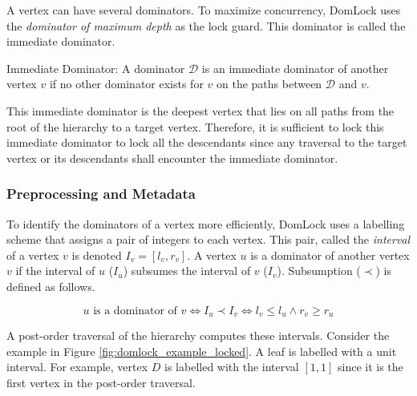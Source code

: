 A vertex can have several dominators. 
To maximize concurrency, DomLock uses the \emph{dominator of maximum depth} as the lock guard. This dominator is called the immediate dominator. 


\begin{definition}
    Immediate Dominator: A dominator $\mathcal{D}$ is an immediate dominator of another vertex $v$ if no other dominator exists for $v$ on the paths between $\mathcal{D}$ and $v$.
\end{definition}

This immediate dominator is the deepest vertex that lies on all paths from the root of the hierarchy to a target vertex. Therefore, it is sufficient to lock this immediate dominator to lock all the descendants since any traversal to the target vertex or its descendants shall encounter the immediate dominator.

\subsubsection{Preprocessing and Metadata}

To identify the dominators of a vertex more efficiently, DomLock uses a labelling scheme that assigns a pair of integers to each vertex. This pair, called the \emph{interval} of a vertex $v$ is denoted  $I_v = [l_v, r_v]$. 
A vertex $u$ is a dominator of another vertex $v$ if the interval of $u$ ($I_u$) subsumes the interval of $v$ ($I_v$). Subsumption ($\prec$) is defined as follows.


\begin{equation}
    u \text{ is a dominator of } v \iff I_u \prec I_v \iff l_v \leq l_u \land r_v \geq r_u
\end{equation}


A post-order traversal of the hierarchy computes these intervals. Consider the example in Figure \ref{fig:domlock_example_locked}. A leaf is labelled with a unit interval. For example, vertex $D$ is labelled with the interval $[1, 1]$ since it is the first vertex in the post-order traversal.  


